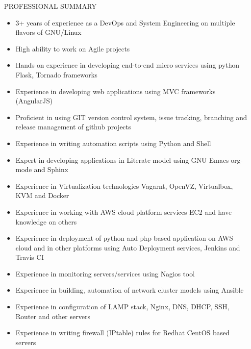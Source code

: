 \documentclass{resume} %
\begin{document}
\begin{rSection}{PROFESSIONAL SUMMARY}
  
  \begin{itemize}
    
  \item 3+ years of experience as a DevOps and System
    Engineering on multiple flavors of GNU/Linux

  \item High ability to work on Agile projects

  \item Hands on experience in developing end-to-end micro
    services using python Flask, Tornado frameworks
    
  \item Experience in developing web applications using MVC
    frameworks (AngularJS)
    
  \item Proficient in using GIT version control system, issue
    tracking, branching and release management of github projects

  \item Experience in writing automation scripts using
    Python and Shell

  \item Expert in developing applications in Literate model using GNU
    Emacs org-mode and Sphinx
    
  \item Experience in Virtualization technologies
    Vagarnt, OpenVZ, Virtualbox, KVM and Docker

  \item Experience in working with AWS cloud platform
    services EC2 and have knowledge on others

  \item Experience in deployment of python and php based application
    on AWS cloud and in other platforms using Auto Deployment
    services, Jenkins and Travis CI

  \item Experience in monitoring servers/services using
    Nagios tool
    
  \item Experience in building, automation of network
    cluster models using Ansible
    
  \item Experience in configuration of LAMP stack,
    Nginx, DNS, DHCP, SSH, Router and other servers

  \item Experience in writing firewall (IPtable) rules for
    Redhat CentOS based servers
    

\end{itemize}
\end{rSection}
\end{document}
